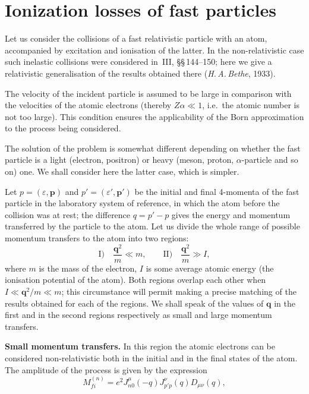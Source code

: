 \section{Ionization losses of fast particles}

Let us consider the collisions of a fast relativistic particle with an atom, accompanied by excitation and ionisation of the latter. In the non-relativistic case such inelastic collisions were considered in~III, \S\S\,144--150; here we give a relativistic generalisation of the results obtained there (\textit{H.\,A.\,Bethe}, 1933).

The velocity of the incident particle is assumed to be large in comparison with the velocities of the atomic electrons (thereby $Z\alpha \ll 1$, i.e.\ the atomic number is not too large). This condition ensures the applicability of the Born approximation to the process being considered.

The solution of the problem is somewhat different depending on whether the fast particle is a light (electron, positron) or heavy (meson, proton, $\alpha$-particle and so on) one. We shall consider here the latter case, which is simpler.

Let $p = (\varepsilon, \mathbf{p})$ and $p' = (\varepsilon', \mathbf{p}')$ be the initial and final 4-momenta of the fast particle in the laboratory system of reference, in which the atom before the collision was at rest; the difference $q = p' - p$ gives the energy and momentum transferred by the particle to the atom. Let us divide the whole range of possible momentum transfers to the atom into two regions:
\begin{equation}
\text{I)}\quad \frac{\mathbf{q}^2}{m} \ll m,\qquad \text{II)}\quad \frac{\mathbf{q}^2}{m} \gg I,
\tag{82.1}
\end{equation}
where $m$ is the mass of the electron, $I$ is some average atomic energy (the ionisation potential of the atom). Both regions overlap each other when $I \ll \mathbf{q}^2/m \ll m$; this circumstance will permit making a precise matching of the results obtained for each of the regions. We shall speak of the values of $\mathbf{q}$ in the first and in the second regions respectively as small and large momentum transfers.

\textbf{Small momentum transfers.} In this region the atomic electrons can be considered non-relativistic both in the initial and in the final states of the atom. The amplitude of the process is given by the expression
\begin{equation}
M_{fi}^{(n)} = e^2 J_{n0}^\mu(-q) J_{p'p}^\nu(q) D_{\mu\nu}(q),
\tag{82.2}
\end{equation}

